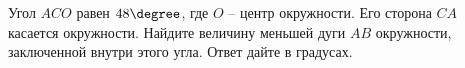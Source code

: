 \begin{ex}
	\begin{condition}
		Угол \( ACO \) равен \( 48\degree \), где \( O \) – центр окружности. Его сторона \( CA \) касается окружности. Найдите величину меньшей дуги \( AB \) окружности, заключенной внутри этого угла. Ответ дайте в градусах.
	\end{condition}
\end{ex}
